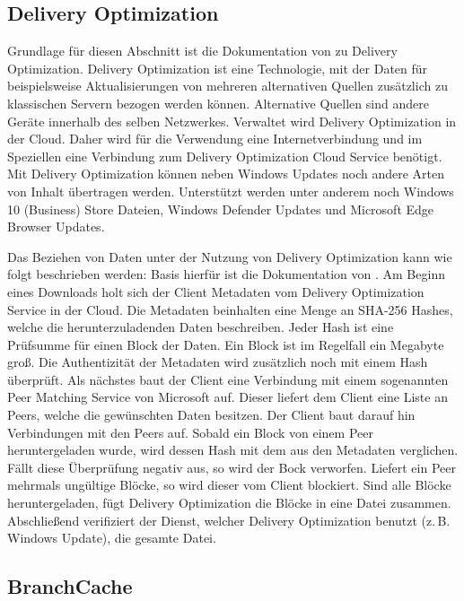\subsection{Delivery Optimization}
Grundlage für diesen Abschnitt ist die Dokumentation von \textcite{microsoftDeliveryOpt} zu Delivery Optimization. Delivery Optimization ist eine Technologie, mit der Daten für beispielsweise Aktualisierungen von mehreren alternativen Quellen zusätzlich zu klassischen Servern bezogen werden können. Alternative Quellen sind andere Geräte innerhalb des selben Netzwerkes. Verwaltet wird Delivery Optimization in der Cloud. Daher wird für die Verwendung eine Internetverbindung und im Speziellen eine Verbindung zum Delivery Optimization Cloud Service benötigt. 
Mit Delivery Optimization können neben Windows Updates noch andere Arten von Inhalt übertragen werden. Unterstützt werden unter anderem noch Windows 10 (Business) Store Dateien, Windows Defender Updates und Microsoft Edge Browser Updates. 

Das Beziehen von Daten unter der Nutzung von Delivery Optimization kann wie folgt beschrieben werden: Basis hierfür ist die Dokumentation von \textcite{microsoftDeliveryOptWorkflow}. Am Beginn eines Downloads holt sich der Client Metadaten vom Delivery Optimization Service in der Cloud. Die Metadaten beinhalten eine Menge an SHA-256 Hashes, welche die  herunterzuladenden Daten beschreiben. Jeder Hash ist eine Prüfsumme für einen Block der Daten. Ein Block ist im Regelfall ein Megabyte groß. Die Authentizität der Metadaten wird zusätzlich noch mit einem Hash überprüft. Als nächstes baut der Client eine Verbindung mit einem sogenannten Peer Matching Service von Microsoft auf. Dieser liefert dem Client eine Liste an Peers, welche die gewünschten Daten besitzen. Der Client baut darauf hin Verbindungen mit den Peers auf. Sobald ein Block von einem Peer heruntergeladen wurde, wird dessen Hash mit dem aus den Metadaten verglichen. Fällt diese Überprüfung negativ aus, so wird der Bock verworfen. Liefert ein Peer mehrmals ungültige Blöcke, so wird dieser vom Client blockiert. Sind alle Blöcke heruntergeladen, fügt Delivery Optimization die Blöcke in eine Datei zusammen. Abschließend verifiziert der Dienst, welcher Delivery Optimization benutzt (z.\,B. Windows Update), die gesamte Datei.   

\subsection{BranchCache}

